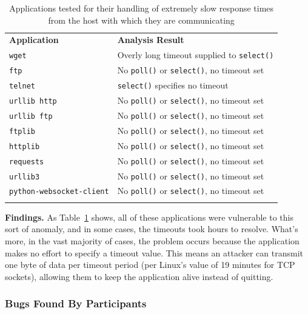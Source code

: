 \begin{table}[t]
  \scriptsize{}
  \begin{tabular}{l | l}
    \toprule{}
    {\bf Application}              & {\bf Analysis Result}\\
    {\tt wget}                     & Overly long timeout supplied to {\tt select()} \\
    {\tt ftp}                      & No {\tt poll()} or {\tt select()}, no timeout set \\
    {\tt telnet}                   & {\tt select()} specifies no timeout \\
    {\tt urllib http}              & No {\tt poll()} or {\tt select()}, no timeout set \\
    {\tt urllib ftp}               & No {\tt poll()} or {\tt select()}, no timeout set \\
    {\tt ftplib}                   & No {\tt poll()} or {\tt select()}, no timeout set \\
    {\tt httplib}                  & No {\tt poll()} or {\tt select()}, no timeout set \\
    {\tt requests}                 & No {\tt poll()} or {\tt select()}, no timeout set \\
    {\tt urllib3}                  & No {\tt poll()} or {\tt select()}, no timeout set \\
    {\tt python-websocket-client}  & No {\tt poll()} or {\tt select()}, no timeout set \\
    \bottomrule{}
  \end{tabular}
  \caption{Applications tested for their handling of extremely slow response
    times from the host with which they are communicating }
  \label{table:slowloris}
\end{table}


{\bf Findings.} As Table~\ref{table:slowloris} shows, all of these
applications were vulnerable to this sort of anomaly,
and in some cases,
the timeouts took hours to resolve.
What's more, in the vast majority of
cases, the problem occurs because the application makes no effort to
specify a timeout value.  This means an attacker can transmit one byte of
data per timeout period (per Linux's value of 19 minutes for TCP sockets),
allowing them to keep the application alive instead of quitting.

\subsubsection{Bugs Found By Participants}

